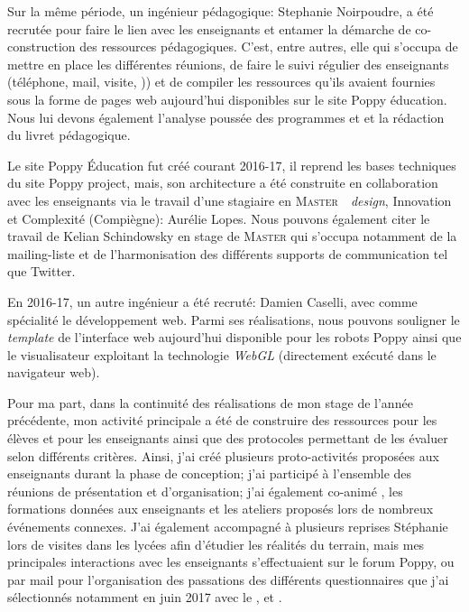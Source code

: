         Sur la même période, un ingénieur pédagogique: Stephanie Noirpoudre, a été recrutée pour faire le lien avec les enseignants et entamer la démarche de co-construction des ressources pédagogiques. C'est, entre autres, elle qui s'occupa de mettre en place les différentes réunions, de faire le suivi régulier des enseignants (\eg téléphone, mail, visite, \etc)) et de compiler les ressources qu'ils avaient fournies sous la forme de pages web aujourd'hui disponibles sur le site Poppy éducation. Nous lui devons également l'analyse poussée des programmes  et  et la rédaction du livret pédagogique.\par%
        Le site Poppy Éducation fut créé courant 2016-17, il reprend les bases techniques du site Poppy project, mais, son architecture a été construite en collaboration avec les enseignants via le travail d'une stagiaire en \textsc{Master}~~\textit{design}, Innovation et Complexité (Compiègne): Aurélie Lopes.
        Nous pouvons également citer le travail de Kelian Schindowsky en stage de \textsc{Master}  qui s'occupa notamment de la mailing-liste et de l'harmonisation des différents supports de communication tel que Twitter.\par%
        En 2016-17, un autre ingénieur a été recruté: Damien Caselli, avec comme spécialité le développement web. Parmi ses réalisations, nous pouvons souligner le \textit{template} de l'interface web aujourd'hui disponible pour les robots Poppy ainsi que le visualisateur exploitant la technologie \textit{WebGL} (directement exécuté dans le navigateur web).\par%
        Pour ma part, dans la continuité des réalisations de mon stage de l'année précédente, mon activité principale a été de construire des ressources pour les élèves et pour les enseignants ainsi que des protocoles permettant de les évaluer selon différents critères.
        Ainsi, j'ai créé plusieurs proto-activités proposées aux enseignants durant la phase de conception; j'ai participé à l'ensemble des réunions de présentation et d'organisation; j'ai également co-animé , les formations données aux enseignants et les ateliers proposés lors de nombreux événements connexes. J'ai également accompagné à plusieurs reprises Stéphanie lors de visites dans les lycées afin d'étudier les réalités du terrain, mais mes principales interactions avec les enseignants s'effectuaient sur le forum Poppy, ou par mail pour l'organisation des passations des différents questionnaires que j'ai sélectionnés notamment en juin 2017 avec le ,  et .\par%
